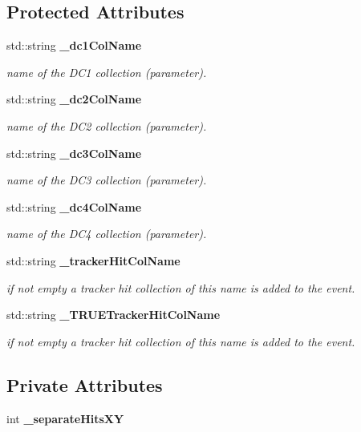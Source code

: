 \subsection*{Protected Attributes}
\begin{DoxyCompactItemize}
\item 
std\-::string {\bf \-\_\-dc1\-Col\-Name}
\begin{DoxyCompactList}\small\item\em name of the D\-C1 collection (parameter). \end{DoxyCompactList}\item 
std\-::string {\bf \-\_\-dc2\-Col\-Name}
\begin{DoxyCompactList}\small\item\em name of the D\-C2 collection (parameter). \end{DoxyCompactList}\item 
std\-::string {\bf \-\_\-dc3\-Col\-Name}
\begin{DoxyCompactList}\small\item\em name of the D\-C3 collection (parameter). \end{DoxyCompactList}\item 
std\-::string {\bf \-\_\-dc4\-Col\-Name}
\begin{DoxyCompactList}\small\item\em name of the D\-C4 collection (parameter). \end{DoxyCompactList}\item 
std\-::string {\bf \-\_\-tracker\-Hit\-Col\-Name}
\begin{DoxyCompactList}\small\item\em if not empty a tracker hit collection of this name is added to the event. \end{DoxyCompactList}\item 
std\-::string {\bf \-\_\-\-T\-R\-U\-E\-Tracker\-Hit\-Col\-Name}
\begin{DoxyCompactList}\small\item\em if not empty a tracker hit collection of this name is added to the event. \end{DoxyCompactList}\end{DoxyCompactItemize}
\subsection*{Private Attributes}
\begin{DoxyCompactItemize}
\item 
int {\bfseries \-\_\-separate\-Hits\-X\-Y}\label{classTBTrackDigitizer_a61155291cafa45d49005249498b45735}

\end{DoxyCompactItemize}


